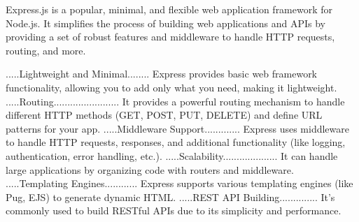 

Express.js is a popular, minimal, and flexible web application framework for Node.js.
It simplifies the process of building web applications and APIs by providing a set of robust features 
and middleware to handle HTTP requests, routing, and more.


{.....Lightweight and Minimal........} Express provides basic web framework functionality, allowing you to add only what you need, making it lightweight.
{.....Routing........................} It provides a powerful routing mechanism to handle different HTTP methods (GET, POST, PUT, DELETE) and define URL patterns for your app.
{.....Middleware Support.............} Express uses middleware to handle HTTP requests, responses, and additional functionality (like logging, authentication, error handling, etc.).
{.....Scalability....................} It can handle large applications by organizing code with routers and middleware.
{.....Templating Engines............ } Express supports various templating engines (like Pug, EJS) to generate dynamic HTML.
{.....REST API Building..............} It's commonly used to build RESTful APIs due to its simplicity and performance.
